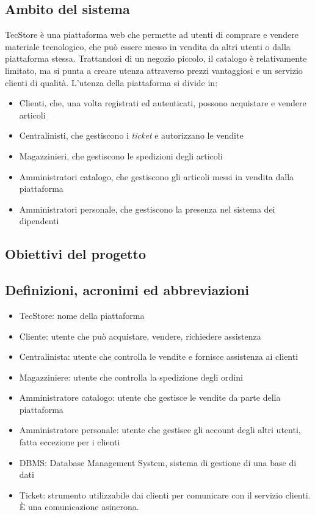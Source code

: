 \documentclass[12pt,a4paper]{article}
\begin{document}
\subsection{Ambito del sistema}
TecStore è una piattaforma web che permette ad utenti di comprare e vendere materiale tecnologico, che può essere messo in vendita da altri utenti o dalla piattaforma stessa. Trattandosi di un negozio piccolo, il catalogo è relativamente limitato, ma si punta a creare utenza attraverso prezzi vantaggiosi e un servizio clienti di qualità.
L'utenza della piattaforma si divide in:
\begin{itemize}
\item Clienti, che, una volta registrati ed autenticati, possono acquistare e vendere articoli
\item Centralinisti, che gestiscono i \emph{ticket} e autorizzano le vendite
\item Magazzinieri, che gestiscono le spedizioni degli articoli
\item Amministratori catalogo, che gestiscono gli articoli messi in vendita dalla piattaforma
\item Amministratori personale, che gestiscono la presenza nel sistema dei dipendenti
\end{itemize}

\subsection{Obiettivi del progetto}

\subsection{Definizioni, acronimi ed abbreviazioni}

\begin{itemize}
\item TecStore: nome della piattaforma 
\item Cliente: utente che può acquistare, vendere, richiedere assistenza
\item Centralinista: utente che controlla le vendite e fornisce assistenza ai clienti
\item Magazziniere: utente che controlla la spedizione degli ordini
\item Amministratore catalogo: utente che gestisce le vendite da parte della piattaforma
\item Amministratore personale: utente che gestisce gli account degli altri utenti, fatta eccezione per i clienti
\item DBMS: Database Management System, sistema di gestione di una base di dati
\item Ticket: strumento utilizzabile dai clienti per comunicare con il servizio clienti. È una comunicazione asincrona.
\end{itemize}
\end{document}
